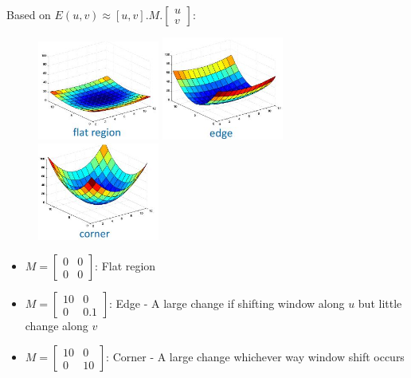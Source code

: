 \documentclass{report}
\begin{document}
Based on $
E(u,v) \approx [u,v] . M . \begin{bmatrix}
    u \\
    v
\end{bmatrix}
$: 
\begin{figure}[h]
    \centering
    \includegraphics[width=4cm]{Flat.JPG}
    \hspace{1cm}
    \includegraphics[width=4cm]{Edge.JPG}
    \hspace{1cm}
    \includegraphics[width=4cm]{Corner.JPG}
\end{figure}
\begin{itemize}
    \item $M = \begin{bmatrix}
        0 & 0 \\ 
        0 & 0
    \end{bmatrix}$: Flat region 

    \item $M = \begin{bmatrix}
        10 & 0 \\ 
        0 & 0.1
    \end{bmatrix}$: Edge - A large change if shifting window along $u$ but little
    change along $v$ 

    \item $M = \begin{bmatrix}
        10 & 0 \\ 
        0 & 10
    \end{bmatrix}$: Corner - A large change whichever way window shift occurs 
\end{itemize}
\end{document}
